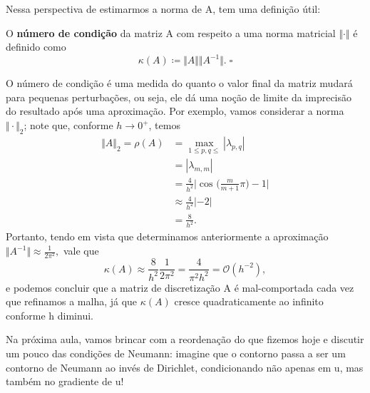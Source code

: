 \documentclass[../differential_methods.tex]{subfiles}
\begin{document}
Nessa perspectiva de estimarmos a norma de A, tem uma definição útil:
\begin{def*}
	O \textbf{número de condição} da matriz A com respeito a uma norma matricial \(\Vert \cdot  \Vert\) é definido como
	\[
		\kappa (A)\coloneqq \Vert A \Vert\Vert A^{-1} \Vert. \; \square
	\]
\end{def*}
O número de condição é uma medida do quanto o valor final da matriz mudará para pequenas perturbações, ou seja, ele dá uma noção de limite da imprecisão do resultado após uma aproximação. Por exemplo, vamos considerar a norma \(\Vert \cdot  \Vert_{2}\); note que, conforme \(h\to 0^{+}\), temos
\begin{align*}
	\Vert A \Vert_{2} = \rho (A) & = \max\limits_{1\leq p, q\leq }| \lambda_{p, q} |                                   \\
	                             & = | \lambda_{m, m} |                                                                \\
	                             & = \frac{4}{h^{2}}\biggl\vert \cos^{}{\biggl(\frac{m}{m+1}\pi \biggr)} -1\biggr\vert \\
	                             & \approx \frac{4}{h^{2}}| -2 |                                                       \\
	                             & = \frac{8}{h^{2}}.
\end{align*}
Portanto, tendo em vista que determinamos anteriormente a aproximação \(\Vert A^{-1} \Vert\approx \frac{1}{2\pi^{2}},\) vale que
\[
	\kappa (A)\approx \frac{8}{h^{2}}\frac{1}{2\pi^{2}}=\frac{4}{\pi^{2}h^{2}}=\mathcal{O}(h^{-2}),
\]
e podemos concluir que a matriz de discretização A é mal-comportada cada vez que refinamos a malha, já que \(\kappa (A)\) cresce quadraticamente ao infinito conforme h diminui.

Na próxima aula, vamos brincar com a reordenação do que fizemos hoje e discutir um pouco das condições de Neumann: imagine que o contorno passa a ser um contorno de Neumann ao invés de Dirichlet, condicionando não apenas em u, mas também no gradiente de u!
\end{document}
